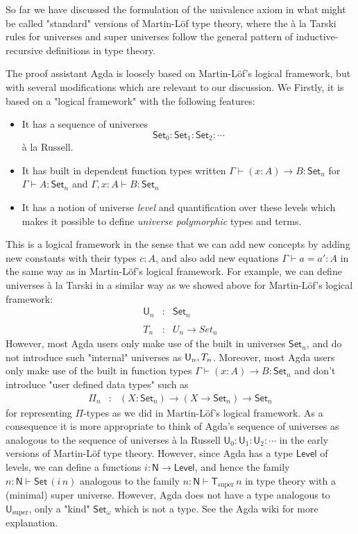 \documentclass[10pt,a4paper]{article}
\def\UU{\mathsf{U}}
\def\Level{\mathsf{Level}}
\newcommand{\N}{\mathsf{N}}
\newcommand{\Set}{\mathsf{Set}}
\newcommand{\U}{\mathsf{U}}
\newcommand{\T}{\mathsf{T}}
\newcommand{\Usuper}{\U_{\mathrm{super}}}
\newcommand{\Tsuper}{\T_{\mathrm{super}}}
\begin{document}
So far we have discussed the formulation of the univalence axiom in what might be called "standard" versions of Martin-Löf type theory, where the \`a la Tarski rules for universes and super universes follow the general pattern of inductive-recursive definitions in type theory.

The proof assistant Agda is loosely based on Martin-Löf's logical framework, but with several modifications which are relevant to our discussion. We Firstly, it is based on a "logical framework" with the following features:
\begin{itemize}
\item It has a sequence of universes  $$\Set_0 : \Set_1 : \Set_2 : \cdots$$  \`a la Russell.
\item It has built in dependent function types written $\Gamma \vdash (x : A)\to B : \Set_n$ for $\Gamma \vdash A : \Set_n$ and $\Gamma , x : A \vdash B : \Set_n$
\item It has a notion of universe {\em level} and quantification over these levels which makes it possible to define {\em universe polymorphic} types and terms. 
\end{itemize}
This is a logical framework in the sense that we can add new concepts by adding new constants with their types $c : A$, and also add new equations $\Gamma \vdash a = a' : A$ in the same way as in Martin-Löf's logical framework. For example, we can define universes \`a la Tarski in a similar way as we showed above for Martin-Löf's logical framework:
\begin{eqnarray*}
\UU_n &: &\Set_n\\
\\T_n &:& U_n \to Set_n
\end{eqnarray*}
However, most Agda users only make use of the built in universes $\Set_n$, and do not introduce such "internal" universes as $\UU_n, \\T_n$. Moreover, most Agda users only make use of the built in function types $\Gamma \vdash (x : A)\to B : \Set_n$ and don't introduce "user defined data types" such as
\begin{eqnarray*}
\Pi_n &:& (X:\Set_n) \to (X \to \Set_n) \to \Set_n
\end{eqnarray*}
for representing $\Pi$-types as we did in Martin-Löf's logical framework. As a consequence it is more appropriate to think of Agda's sequence of universes as analogous to the sequence of universes  \`a la Russell $ \UU_0 : \UU_1 : \UU_2 : \cdots$ in the early versions of Martin-Löf type theory. However, since Agda has a type $\Level$ of levels, we can define a functions $i : \N \to \Level$, and hence the family $n : \N \vdash \Set\, (i\, n)$ analogous to the family $n : \N \vdash \Tsuper\,n$ in type theory with a (minimal) super universe. However, Agda does not have a type analogous to $\Usuper$, only a "kind" $\Set_\omega$ which is not a type. See the Agda wiki for more explanation.
\end{document}
